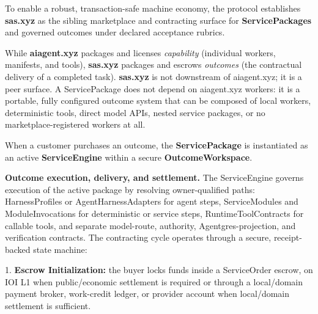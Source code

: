 \documentclass[
  11pt,
]{article}
\begin{document}
To enable a robust, transaction-safe machine economy, the protocol
establishes \textbf{sas.xyz} as the sibling marketplace and contracting
surface for \textbf{ServicePackages} and governed outcomes under declared
acceptance rubrics.

While \textbf{aiagent.xyz} packages and licenses \emph{capability}
(individual workers, manifests, and tools), \textbf{sas.xyz} packages
and escrows \emph{outcomes} (the contractual delivery of a completed
task). \textbf{sas.xyz} is not downstream of aiagent.xyz; it is a peer
surface. A ServicePackage does not depend on aiagent.xyz workers: it is
a portable, fully configured outcome system that can be composed of
local workers, deterministic tools, direct model APIs, nested service
packages, or no marketplace-registered workers at all.

When a customer purchases an outcome, the \textbf{ServicePackage} is
instantiated as an active \textbf{ServiceEngine} within a secure
\textbf{OutcomeWorkspace}.


\begin{center}
\end{center}

\textbf{Outcome execution, delivery, and settlement.} The ServiceEngine
governs execution of the active package by resolving owner-qualified paths:
HarnessProfiles or AgentHarnessAdapters for agent steps,
ServiceModules and ModuleInvocations for deterministic or service steps,
RuntimeToolContracts for callable tools, and separate model-route, authority,
Agentgres-projection, and verification contracts. The contracting cycle
operates through a secure, receipt-backed state machine:

1. \textbf{Escrow Initialization:} the buyer locks funds inside a
ServiceOrder escrow, on IOI L1 when public/economic settlement is
required or through a local/domain payment broker, work-credit ledger, or
provider account when local/domain settlement is sufficient.
\end{document}
